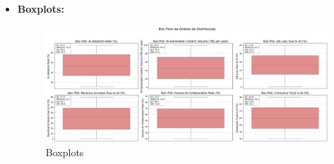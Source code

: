 \documentclass[12pt]{article}
\begin{document}
\begin{itemize}
    \item \textbf{Boxplots:}
    \begin{figure}[H]
        \centering
        \includegraphics[width=1\textwidth]{boxplots.png}
        \caption{Boxplots}
    \end{figure}


\end{itemize}
\end{document}
